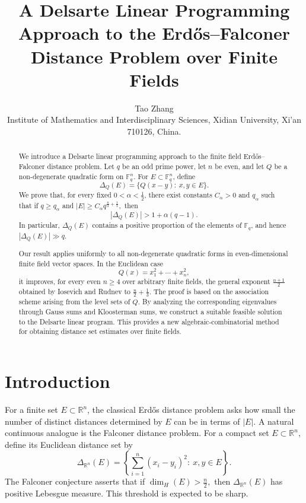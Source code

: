 \documentclass[11pt]{article}
\title{A Delsarte Linear Programming Approach to the Erd\H{o}s--Falconer Distance Problem over Finite Fields}
\author{Tao Zhang\\
\footnotesize Institute of Mathematics and Interdisciplinary Sciences, Xidian University, Xi'an 710126, China.\\
	}
\date{}
\newcommand{\1}{\mathbf{1}}
\begin{document}
\maketitle
\begingroup
\renewcommand\thefootnote{}%
\addtocounter{footnote}{-1}%
\endgroup

\begin{abstract}
	We introduce a Delsarte linear programming approach to the finite field Erd\H{o}s--Falconer distance problem. Let \(q\) be an odd prime power, let \(n\) be even, and let \(Q\) be a non-degenerate quadratic form on \(\mathbb{F}_q^n\). For \(E\subset \mathbb{F}_q^n\), define
	\[
	\Delta_Q(E)=\{Q(x-y):\ x,y\in E\}.
	\]
	We prove that, for every fixed \(0<\alpha<\frac{1}{2}\), there exist constants \(C_\alpha>0\) and \(q_\alpha\) such that if \(q\ge q_\alpha\) and $|E|\ge C_\alpha q^{\frac n2+\frac13},$
	then
	\[
	|\Delta_Q(E)|>1+\alpha(q-1).
	\]
	In particular, \(\Delta_Q(E)\) contains a positive proportion of the elements of \(\mathbb{F}_q\), and hence \(|\Delta_Q(E)|\gg q\).
	
	Our result applies uniformly to all non-degenerate quadratic forms in even-dimensional finite field vector spaces. In the Euclidean case
	\[
	Q(x)=x_1^2+\cdots+x_n^2,
	\]
	it improves, for every even \(n\ge 4\) over arbitrary finite fields, the general exponent \(\frac{n+1}{2}\) obtained by Iosevich and Rudnev to $\frac n2+\frac13.$
	The proof is based on the association scheme arising from the level sets of \(Q\). By analyzing the corresponding eigenvalues through Gauss sums and Kloosterman sums, we construct a suitable feasible solution to the Delsarte linear program. This provides a new algebraic-combinatorial method for obtaining distance set estimates over finite fields.
	
		\medskip
	
	
	\smallskip
	
\end{abstract}

\section{Introduction}

For a finite set \(E\subset \mathbb{R}^n\), the classical Erd\H{o}s distance problem asks how small the number of distinct distances determined by \(E\) can be in terms of \(|E|\). A natural continuous analogue is the Falconer distance problem. For a compact set \(E\subset\mathbb{R}^n\), define its Euclidean distance set by
\[
\Delta_{\mathbb{R}^n}(E)
=
\left\{
\sum_{i=1}^n (x_i-y_i)^2:\ x,y\in E
\right\}.
\]
The Falconer conjecture asserts that if $\dim_H(E)>\frac n2,$
then \(\Delta_{\mathbb{R}^n}(E)\) has positive Lebesgue measure. This threshold is expected to be sharp.
\end{document}
